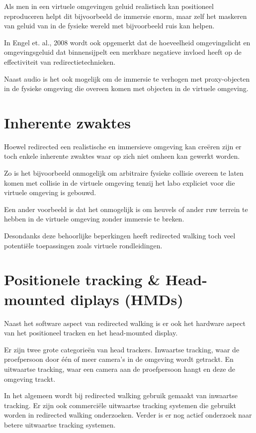 Als men in een virtuele omgevingen geluid realistisch kan positioneel
reproduceren helpt dit bijvoorbeeld de immersie enorm\cite{lackner77}, maar zelf
het maskeren van geluid van in de fysieke wereld met bijvoorbeeld ruis kan
helpen\cite{usoh99}.

In Engel et. al., 2008\cite{engel08} wordt ook opgemerkt dat de hoeveelheid 
omgevingslicht en omgevingsgeluid dat binnensijpelt een merkbare negatieve 
invloed heeft op de effectiviteit van redirectietechnieken.

Naast audio is het ook mogelijk om de immersie te verhogen met proxy-objecten in
de fysieke omgeving die overeen komen met objecten in de virtuele 
omgeving\cite{steinicke09}.


\section{Inherente zwaktes}
Hoewel redirected een realistische en immersieve omgeving kan cre\"eren zijn er
toch enkele inherente zwaktes waar op zich niet omheen kan gewerkt worden.

Zo is het bijvoorbeeld onmogelijk om arbitraire fysieke collisie overeen te laten
komen met collisie in de virtuele omgeving tenzij het labo expliciet voor die
virtuele omgeving is gebouwd.

Een ander voorbeeld is dat het onmogelijk is om heuvels of ander ruw terrein te
hebben in de virtuele omgeving zonder immersie te breken.

Desondanks deze behoorlijke beperkingen heeft redirected walking toch veel
potenti\"ele toepassingen zoals virtuele rondleidingen.


\section{Positionele tracking \& Head-mounted diplays (HMDs)}
Naast het software aspect van redirected walking is er ook het hardware aspect
van het positioneel tracken en het head-mounted display.

Er zijn twee grote categorie\"en van head trackers. Inwaartse tracking, waar de
proefpersoon door \'e\'en of meer camera's in de omgeving wordt getrackt. En
uitwaartse tracking, waar een camera aan de proefpersoon hangt en deze de
omgeving trackt.

In het algemeen wordt bij redirected walking gebruik gemaakt van inwaartse 
tracking\cite{bruder08,engel08,steinicke09,kohn01,neth12,ward92}. Er zijn ook 
commerci\"ele uitwaartse tracking systemen die gebruikt worden in redirected
walking onderzoeken\cite{peck09,suma11}. Verder is er nog actief onderzoek naar
betere uitwaartse tracking systemen\cite{maesen13}.

